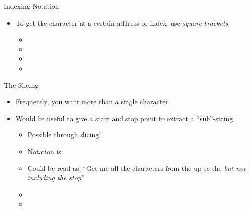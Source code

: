 \documentclass[pdf, aspectratio=169, 12pt]{beamer}
\begin{document}
\begin{frame}{Indexing Notation}
	\begin{itemize}
		\item To get the character at a certain address or index, use \emph{square brackets}
	\begin{center}
	\end{center}
	\begin{itemize}
		\item {}
		\item {}
		\item {}
		\item {}
	\end{itemize}
	\end{itemize}
\end{frame}

\begin{frame}{The Slicing}
	\begin{itemize}
		\item Frequently, you want more than a single character
		\item Would be useful to give a start and stop point to extract a ``sub''-string
			\begin{itemize}
				\item Possible through \alert{slicing}!
				\item Notation is: 
				\item Could be read as: ``Get me all the characters from the  up to the  \emph{but not including the stop}''
			\begin{center}
			\end{center}
			\item {}
			\item {}
			\end{itemize}
	\end{itemize}
\end{frame}
\end{document}
